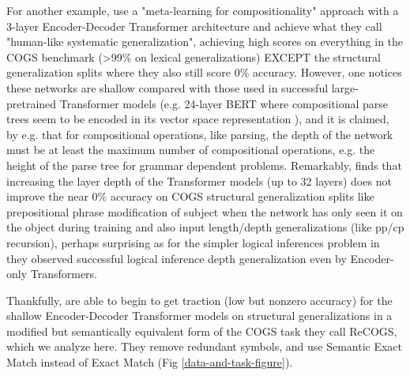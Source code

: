 \documentclass[11pt]{article}
\begin{document}
For another example, \cite{lake2023human} use a "meta-learning for compositionality" approach with a 3-layer Encoder-Decoder Transformer architecture and achieve what they call "human-like systematic generalization", achieving high scores on everything in the COGS benchmark (>99\% on lexical generalizations) EXCEPT the structural generalization splits where they also still score 0\% accuracy.
However, one notices these networks are shallow compared with those used in successful large-pretrained Transformer models (e.g. 24-layer BERT where compositional parse trees seem to be encoded in its vector space representation \cite{hewitt-manning-2019-structural}), and it is claimed, by e.g. \cite{Csordas2022} that for compositional operations, like parsing, the depth of the network must be at least the maximum number of compositional operations, e.g. the height of the parse tree for grammar dependent problems. Remarkably, \cite{petty2024impactdepthcompositionalgeneralization} finds that increasing the layer depth of the Transformer models (up to 32 layers) does not improve the near 0\% accuracy on COGS structural generalization splits like prepositional phrase modification of subject when the network has only seen it on the object during training and also input length/depth generalizations (like pp/cp recursion), perhaps surprising as for the simpler logical inferences problem in \cite{Clark2020} they observed successful logical inference depth generalization even by Encoder-only Transformers.

Thankfully, \cite{Wu2023} are able to begin to get traction (low but nonzero accuracy) for the shallow Encoder-Decoder Transformer models on structural generalizations in a modified but semantically equivalent form of the COGS task they call ReCOGS, which we analyze here. They remove redundant symbols, and use Semantic Exact Match instead of Exact Match (Fig \ref{data-and-task-figure}).

\end{document}

